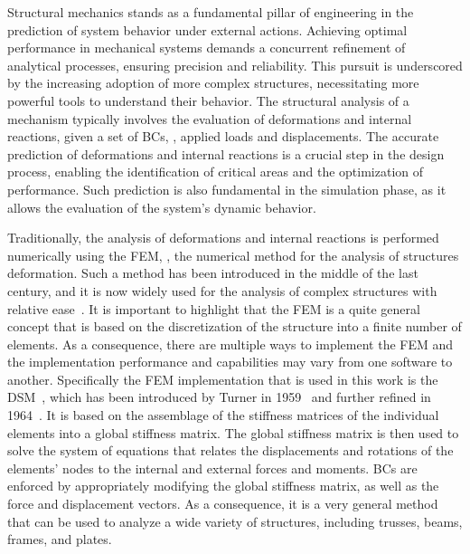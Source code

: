 Structural mechanics stands as a fundamental pillar of engineering in the prediction of system behavior under external actions. Achieving optimal performance in mechanical systems demands a concurrent refinement of analytical processes, ensuring precision and reliability. This pursuit is underscored by the increasing adoption of more complex structures, necessitating more powerful tools to understand their behavior. The structural analysis of a mechanism typically involves the evaluation of deformations and internal reactions, given a set of \acp{BC}, \eg{}, applied loads and displacements. The accurate prediction of deformations and internal reactions is a crucial step in the design process, enabling the identification of critical areas and the optimization of performance. Such prediction is also fundamental in the simulation phase, as it allows the evaluation of the system's dynamic behavior.

Traditionally, the analysis of deformations and internal reactions is performed numerically using the \ac{FEM}, \ie{}, the numerical method for the analysis of structures deformation. Such a method has been introduced in the middle of the last century, and it is now widely used for the analysis of complex structures with relative ease~\cite{felippa2001historical}. It is important to highlight that the \ac{FEM} is a quite general concept that is based on the discretization of the structure into a finite number of elements. As a consequence, there are multiple ways to implement the \ac{FEM} and the implementation performance and capabilities may vary from one software to another. Specifically the \ac{FEM} implementation that is used in this work is the \ac{DSM}~\cite{samuelsson2006history}, which has been introduced by Turner in 1959~\cite{turner1959direct} and further refined in 1964~\cite{turner1964further}. It is based on the assemblage of the stiffness matrices of the individual elements into a global stiffness matrix. The global stiffness matrix is then used to solve the system of equations that relates the displacements and rotations of the elements' nodes to the internal and external forces and moments. \acp{BC} are enforced by appropriately modifying the global stiffness matrix, as well as the force and displacement vectors. As a consequence, it is a very general method that can be used to analyze a wide variety of structures, including trusses, beams, frames, and plates.

